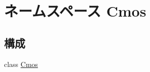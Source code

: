 \hypertarget{namespaceCmos}{
\section{ネームスペース Cmos}
\label{namespaceCmos}
}
\subsection*{構成}
\begin{DoxyCompactItemize}
\item 
class \hyperlink{classCmos_1_1Cmos}{Cmos}
\end{DoxyCompactItemize}
